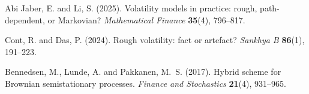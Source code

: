  Abi Jaber, E. and Li, S. (2025).
Volatility models in practice: rough, path-dependent, or Markovian?
\emph{Mathematical Finance} \textbf{35}(4), 796--817.



 Cont, R. and Das, P. (2024).
Rough volatility: fact or artefact?
\emph{Sankhya B} \textbf{86}(1), 191--223.


 Bennedsen, M., Lunde, A. and Pakkanen, M.~S. (2017).
Hybrid scheme for Brownian semistationary processes.
\emph{Finance and Stochastics} \textbf{21}(4), 931--965.

